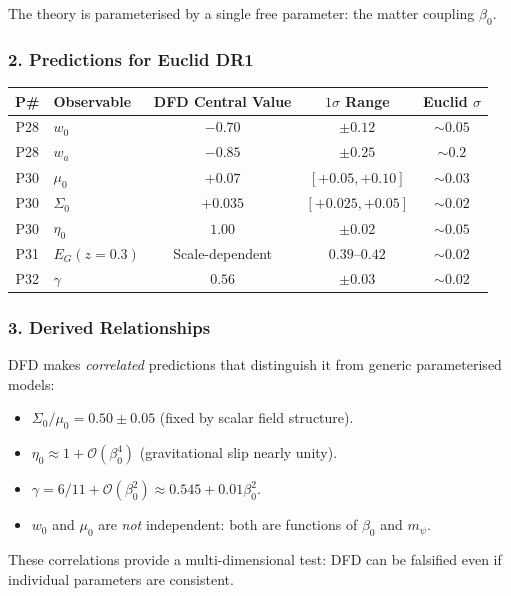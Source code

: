 \documentclass[11pt,a4paper]{article}
\begin{document}
The theory is parameterised by a single free parameter: the matter coupling $\beta_0$.

\subsubsection*{2. Predictions for Euclid DR1}

\begin{center}
\begin{longtable}{clccc}
\toprule
\textbf{P\#} & \textbf{Observable} & \textbf{DFD Central Value} & \textbf{$1\sigma$ Range} & \textbf{Euclid $\sigma$} \\
\midrule
\endfirsthead
P28 & $w_0$ & $-0.70$ & $\pm 0.12$ & $\sim 0.05$ \\
P28 & $w_a$ & $-0.85$ & $\pm 0.25$ & $\sim 0.2$ \\
P30 & $\mu_0$ & $+0.07$ & $[+0.05, +0.10]$ & $\sim 0.03$ \\
P30 & $\Sigma_0$ & $+0.035$ & $[+0.025, +0.05]$ & $\sim 0.02$ \\
P30 & $\eta_0$ & $1.00$ & $\pm 0.02$ & $\sim 0.05$ \\
P31 & $E_G(z=0.3)$ & Scale-dependent & $0.39$--$0.42$ & $\sim 0.02$ \\
P32 & $\gamma$ & $0.56$ & $\pm 0.03$ & $\sim 0.02$ \\
\bottomrule
\end{longtable}
\end{center}

\subsubsection*{3. Derived Relationships}

DFD makes \emph{correlated} predictions that distinguish it from generic parameterised models:
\begin{itemize}
\item $\Sigma_0 / \mu_0 = 0.50 \pm 0.05$ (fixed by scalar field structure).
\item $\eta_0 \approx 1 + \mathcal{O}(\beta_0^4)$ (gravitational slip nearly unity).
\item $\gamma = 6/11 + \mathcal{O}(\beta_0^2) \approx 0.545 + 0.01\beta_0^2$.
\item $w_0$ and $\mu_0$ are \emph{not} independent: both are functions of $\beta_0$ and $m_\psi$.
\end{itemize}

These correlations provide a multi-dimensional test: DFD can be falsified even if individual parameters are consistent.
\end{document}
